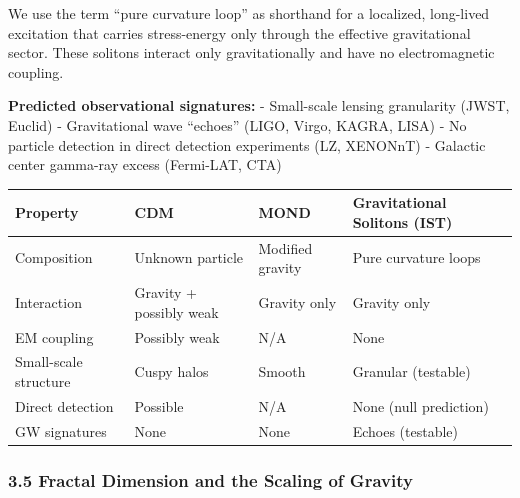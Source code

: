 \documentclass[
]{article}
\begin{document}
We use the term ``pure curvature loop'' as shorthand for a localized,
long-lived excitation that carries stress-energy only through the
effective gravitational sector. These solitons interact only
gravitationally and have no electromagnetic coupling.

\textbf{Predicted observational signatures:} - Small-scale lensing
granularity (JWST, Euclid) - Gravitational wave ``echoes'' (LIGO, Virgo,
KAGRA, LISA) - No particle detection in direct detection experiments
(LZ, XENONnT) - Galactic center gamma-ray excess (Fermi-LAT, CTA)

\begin{longtable}[]{@{}
  >{\raggedright\arraybackslash}p{}
  >{\raggedright\arraybackslash}p{}
  >{\raggedright\arraybackslash}p{}
  >{\raggedright\arraybackslash}p{}@{}}
\toprule\noalign{}
\begin{minipage}[b]{\linewidth}\raggedright
Property
\end{minipage} & \begin{minipage}[b]{\linewidth}\raggedright
CDM
\end{minipage} & \begin{minipage}[b]{\linewidth}\raggedright
MOND
\end{minipage} & \begin{minipage}[b]{\linewidth}\raggedright
Gravitational Solitons (IST)
\end{minipage} \\
\midrule\noalign{}
\endhead
\bottomrule\noalign{}
\endlastfoot
Composition & Unknown particle & Modified gravity & Pure curvature
loops \\
Interaction & Gravity + possibly weak & Gravity only & Gravity only \\
EM coupling & Possibly weak & N/A & None \\
Small-scale structure & Cuspy halos & Smooth & Granular (testable) \\
Direct detection & Possible & N/A & None (null prediction) \\
GW signatures & None & None & Echoes (testable) \\
\end{longtable}

\subsubsection{3.5 Fractal Dimension and the Scaling of
Gravity}\label{fractal-dimension-and-the-scaling-of-gravity}
\end{document}
